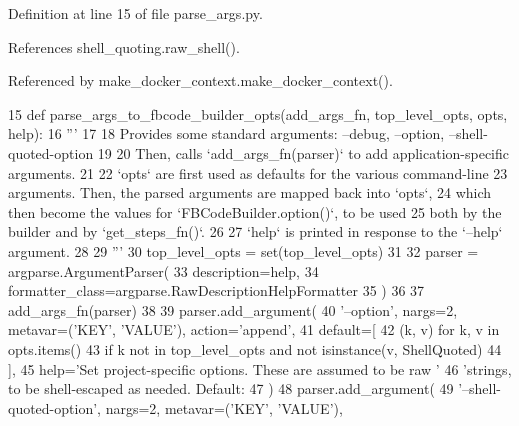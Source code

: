 Definition at line 15 of file parse\+\_\+args.\+py.



References shell\+\_\+quoting.\+raw\+\_\+shell().



Referenced by make\+\_\+docker\+\_\+context.\+make\+\_\+docker\+\_\+context().


\begin{DoxyCode}
15 \textcolor{keyword}{def }parse_args_to_fbcode_builder_opts(add\_args\_fn, top\_level\_opts, opts, help):
16     \textcolor{stringliteral}{'''}
17 \textcolor{stringliteral}{}
18 \textcolor{stringliteral}{    Provides some standard arguments: --debug, --option, --shell-quoted-option}
19 \textcolor{stringliteral}{}
20 \textcolor{stringliteral}{    Then, calls `add\_args\_fn(parser)` to add application-specific arguments.}
21 \textcolor{stringliteral}{}
22 \textcolor{stringliteral}{    `opts` are first used as defaults for the various command-line}
23 \textcolor{stringliteral}{    arguments.  Then, the parsed arguments are mapped back into `opts`,}
24 \textcolor{stringliteral}{    which then become the values for `FBCodeBuilder.option()`, to be used}
25 \textcolor{stringliteral}{    both by the builder and by `get\_steps\_fn()`.}
26 \textcolor{stringliteral}{}
27 \textcolor{stringliteral}{    `help` is printed in response to the `--help` argument.}
28 \textcolor{stringliteral}{}
29 \textcolor{stringliteral}{    '''}
30     top\_level\_opts = set(top\_level\_opts)
31 
32     parser = argparse.ArgumentParser(
33         description=help,
34         formatter\_class=argparse.RawDescriptionHelpFormatter
35     )
36 
37     add\_args\_fn(parser)
38 
39     parser.add\_argument(
40         \textcolor{stringliteral}{'--option'}, nargs=2, metavar=(\textcolor{stringliteral}{'KEY'}, \textcolor{stringliteral}{'VALUE'}), action=\textcolor{stringliteral}{'append'},
41         default=[
42             (k, v) \textcolor{keywordflow}{for} k, v \textcolor{keywordflow}{in} opts.items()
43                 \textcolor{keywordflow}{if} k \textcolor{keywordflow}{not} \textcolor{keywordflow}{in} top\_level\_opts \textcolor{keywordflow}{and} \textcolor{keywordflow}{not} isinstance(v, ShellQuoted)
44         ],
45         help=\textcolor{stringliteral}{'Set project-specific options. These are assumed to be raw '}
46             \textcolor{stringliteral}{'strings, to be shell-escaped as needed. Default: %
47     )
48     parser.add\_argument(
49         \textcolor{stringliteral}{'--shell-quoted-option'}, nargs=2, metavar=(\textcolor{stringliteral}{'KEY'}, \textcolor{stringliteral}{'VALUE'}),
}
\end{DoxyCode}
